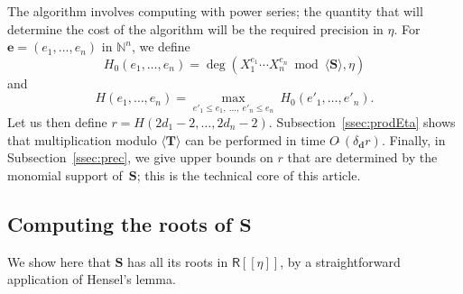 \documentclass[amsthm]{elsart}
\def\d {\ensuremath{\mathbf{d}}}
\def\e {\ensuremath{\mathbf{e}}}
\def\N {\ensuremath{\mathbb{N}}}
\def\S {\ensuremath{\mathbf{S}}}
\def\T {\ensuremath{\mathbf{T}}}
\def\rng {\ensuremath{\mathsf{R}}}
\theoremstyle{plain}
\begin{document}
The algorithm involves computing with power series; the quantity that
will determine the cost of the algorithm will be the required
precision in $\eta$. For $\e=(e_1,\dots,e_n)$ in $\N^n$, we define
$$H_0(e_1,\dots,e_n) = \deg(X_1^{e_1}\cdots X_n^{e_n} \bmod \langle \S \rangle, \eta)$$
and
$$H(e_1,\dots,e_n) = \max_{e'_1 \le e_1,\ \dots,\ e'_n \le e_n}\ 
H_0(e'_1,\dots,e'_n).$$ Let us then define $r=H(2d_1-2,\dots,2d_n-2)$.
Subsection~\ref{ssec:prodEta} shows that multiplication modulo
$\langle \T \rangle$ can be performed in time
$O\tilde{~}(\delta_\d r)$. Finally, in Subsection~\ref{ssec:prec}, we
give upper bounds on $r$ that are determined by the monomial support
of~$\S$; this is the technical core of this article.



\subsection{Computing the roots of $\S$}\label{ssec:roots}

We show here that $\S$ has all its roots in $\rng[[\eta]]$, by a
straightforward application of Hensel's lemma. 
\end{document}
